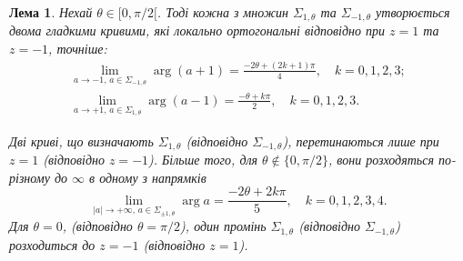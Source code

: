 \documentclass[]{article}
\theoremstyle{plain}
\newtheorem{lemma}{Лема}
\begin{document}
\begin{lemma}
Нехай $\theta \in [0, \pi/2[$. Тоді кожна з множин $\Sigma_{1,\theta}$ та $\Sigma_{-1,\theta}$ утворюється двома гладкими кривими, які локально ортогональні відповідно при $z = 1$ та $z = -1$, точніше:
\begin{align*}
    \lim_{a \to -1, \, a \in \Sigma_{-1,\theta}} \arg(a + 1) =\frac{-2\theta + (2k + 1) \pi}{4}, \quad k = 0, 1, 2, 3; \\ 
    \lim_{a \to +1, \, a \in \Sigma_{1,\theta}} \arg(a - 1) = \frac{-\theta + k\pi}{2}, \quad k = 0, 1, 2, 3.
\end{align*}

Дві криві, що визначають $\Sigma_{1,\theta}$ (відповідно $\Sigma_{-1,\theta}$), перетинаються лише при $z = 1$ (відповідно $z = -1$). Більше того, для $\theta \notin \{0, \pi/2\}$, вони розходяться по-різному до $\infty$ в одному з напрямків
\begin{equation*}
    \lim_{|a| \to +\infty, \, a \in \Sigma_{\pm 1, \theta}} \arg a = \frac{-2\theta + 2k\pi}{5}, \quad k = 0, 1, 2, 3, 4.
\end{equation*}
Для $\theta = 0$, (відповідно $\theta = \pi/2$), один промінь $\Sigma_{1,\theta}$ (відповідно $\Sigma_{-1,\theta}$) розходиться до $z = -1$ (відповідно $z = 1$).
\end{lemma}
\end{document}
